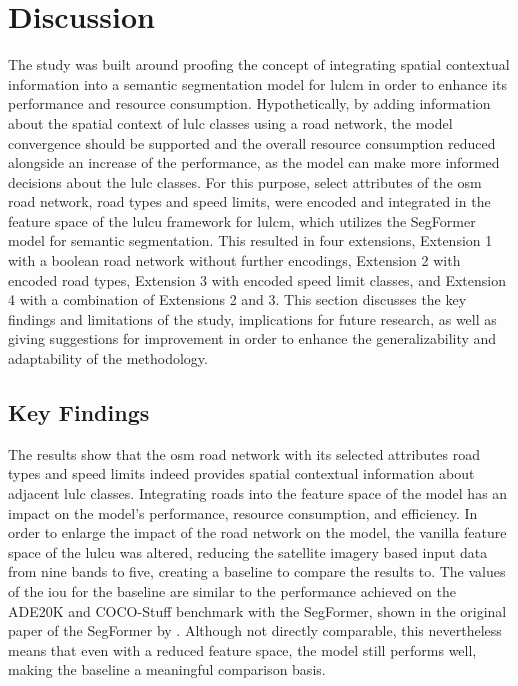 \chapter{Discussion}
\label{sec:discussion}

The study was built around proofing the concept of integrating spatial contextual information into a semantic segmentation model for \gls{lulcm} in order to enhance its performance and resource consumption. Hypothetically, by adding information about the spatial context of \gls{lulc} classes using a road network, the model convergence should be supported and the overall resource consumption reduced alongside an increase of the performance, as the model can make more informed decisions about the \gls{lulc} classes. For this purpose, select attributes of the \gls{osm} road network, road types and speed limits, were encoded and integrated in the feature space of the \gls{lulcu} framework for \gls{lulcm}, which utilizes the SegFormer model for semantic segmentation. This resulted in four extensions, Extension 1 with a boolean road network without further encodings, Extension 2 with encoded road types, Extension 3 with encoded speed limit classes, and Extension 4 with a combination of Extensions 2 and 3. This section discusses the key findings and limitations of the study, implications for future research, as well as giving suggestions for improvement in order to enhance the generalizability and adaptability of the methodology.

\section{Key Findings}

The results show that the \gls{osm} road network with its selected attributes road types and speed limits indeed provides spatial contextual information about adjacent \gls{lulc} classes. Integrating roads into the feature space of the model has an impact on the model's performance, resource consumption, and efficiency. In order to enlarge the impact of the road network on the model, the vanilla feature space of the \gls{lulcu} was altered, reducing the satellite imagery based input data from nine bands to five, creating a baseline to compare the results to. The values of the \gls{iou} for the baseline are similar to the performance achieved on the ADE20K and COCO-Stuff benchmark with the SegFormer, shown in the original paper of the SegFormer by \textcite{Xie.Wang.ea2021}. Although not directly comparable, this nevertheless means that even with a reduced feature space, the model still performs well, making the baseline a meaningful comparison basis.

